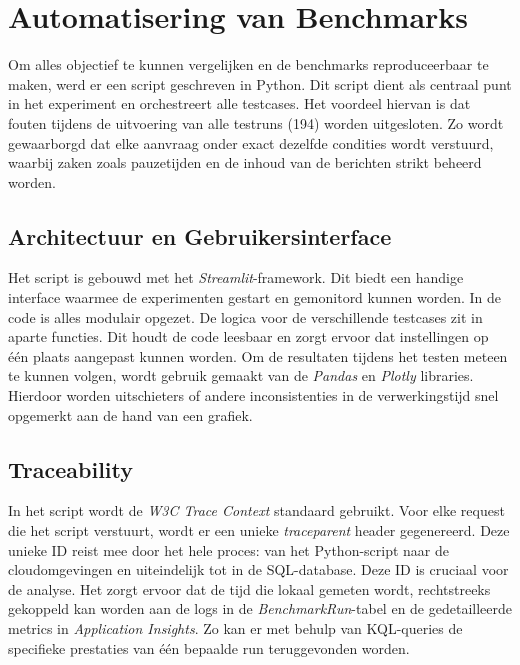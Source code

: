 \section{Automatisering van Benchmarks}

Om alles objectief te kunnen vergelijken en de benchmarks reproduceerbaar te maken, werd er een script geschreven in Python. Dit script dient als centraal punt in het experiment en orchestreert alle testcases. Het voordeel hiervan is dat fouten tijdens de uitvoering van alle testruns (194) worden uitgesloten. Zo wordt gewaarborgd dat elke aanvraag onder exact dezelfde condities wordt verstuurd, waarbij zaken zoals pauzetijden en de inhoud van de berichten strikt beheerd worden.


\subsection{Architectuur en Gebruikersinterface}

Het script is gebouwd met het \textit{Streamlit}-framework. Dit biedt een handige interface waarmee de experimenten gestart en gemonitord kunnen worden. In de code is alles modulair opgezet. De logica voor de verschillende testcases zit in aparte functies. Dit houdt de code leesbaar en zorgt ervoor dat instellingen op één plaats aangepast kunnen worden. Om de resultaten tijdens het testen meteen te kunnen volgen, wordt gebruik gemaakt van de \textit{Pandas} en \textit{Plotly} libraries. Hierdoor worden uitschieters of andere inconsistenties in de verwerkingstijd snel opgemerkt aan de hand van een grafiek.

\subsection{Traceability}


In het script wordt de \textit{W3C Trace Context} standaard gebruikt. Voor elke request die het script verstuurt, wordt er een unieke \textit{traceparent} header gegenereerd. Deze unieke ID reist mee door het hele proces: van het Python-script naar de cloudomgevingen en uiteindelijk tot in de SQL-database. Deze ID is cruciaal voor de analyse. Het zorgt ervoor dat de tijd die lokaal gemeten wordt, rechtstreeks gekoppeld kan worden aan de logs in de \textit{BenchmarkRun}-tabel en de gedetailleerde metrics in \textit{Application Insights}. Zo kan er met behulp van KQL-queries de specifieke prestaties van één bepaalde run teruggevonden worden.

